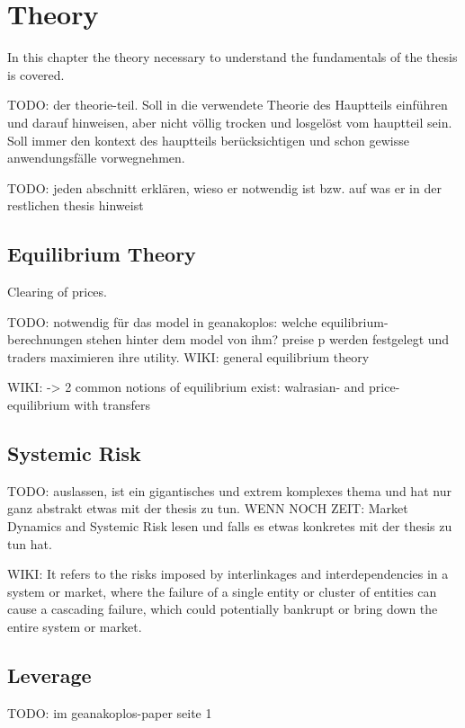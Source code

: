 \documentclass[../Bachelorarbeit.tex]{subfiles}
\begin{document}
\chapter{Theory}
\label{ch:theory}

In this chapter the theory necessary to understand the fundamentals of the thesis is covered. 

TODO: der theorie-teil. Soll in die verwendete Theorie des Hauptteils einführen und darauf hinweisen, aber nicht völlig trocken und losgelöst vom hauptteil sein. Soll immer den kontext des hauptteils berücksichtigen und schon gewisse anwendungsfälle vorwegnehmen.

TODO: jeden abschnitt erklären, wieso er notwendig ist bzw. auf was er in der restlichen thesis hinweist 

\section{Equilibrium Theory}

Clearing of prices.
	
TODO: notwendig für das model in geanakoplos: welche equilibrium-berechnungen stehen hinter dem model von ihm?
preise p werden festgelegt und traders maximieren ihre utility.
WIKI: general equilibrium theory

WIKI:
-> 2 common notions of equilibrium exist: walrasian- and price-equilibrium with transfers




\section{Systemic Risk}
TODO: auslassen, ist ein gigantisches und extrem komplexes thema und hat nur ganz abstrakt etwas mit der thesis zu tun. WENN NOCH ZEIT: Market Dynamics and Systemic Risk lesen und falls es etwas konkretes mit der thesis zu tun hat.

WIKI: It refers to the risks imposed by interlinkages and interdependencies in a system or market, where the failure of a single entity or cluster of entities can cause a cascading failure, which could potentially bankrupt or bring down the entire system or market.

\cite{Milan2010}

\section{Leverage}
TODO: im geanakoplos-paper seite 1
\end{document}
